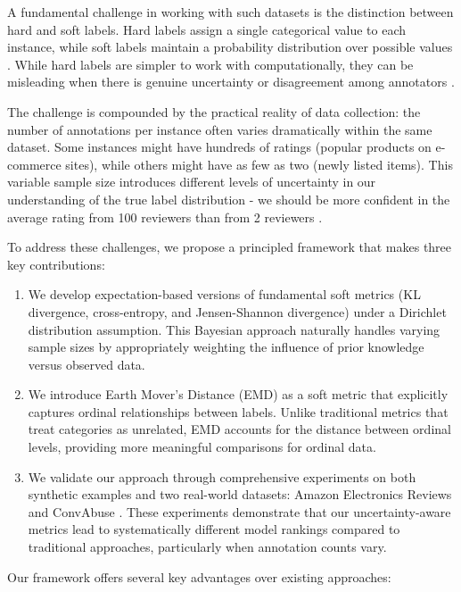 \documentclass[journal]{IEEEtran}
\begin{document}
A fundamental challenge in working with such datasets is the distinction between hard and soft labels. Hard labels assign a single categorical value to each instance, while soft labels maintain a probability distribution over possible values \cite{peterson2019}. While hard labels are simpler to work with computationally, they can be misleading when there is genuine uncertainty or disagreement among annotators \cite{uma2021}.

The challenge is compounded by the practical reality of data collection: the number of annotations per instance often varies dramatically within the same dataset. Some instances might have hundreds of ratings (popular products on e-commerce sites), while others might have as few as two (newly listed items). This variable sample size introduces different levels of uncertainty in our understanding of the true label distribution - we should be more confident in the average rating from 100 reviewers than from 2 reviewers \cite{uma2021}.

To address these challenges, we propose a principled framework that makes three key contributions:

\begin{enumerate}
    \item We develop expectation-based versions of fundamental soft metrics (KL divergence, cross-entropy, and Jensen-Shannon divergence) under a Dirichlet distribution assumption. This Bayesian approach naturally handles varying sample sizes by appropriately weighting the influence of prior knowledge versus observed data.
    
    \item We introduce Earth Mover's Distance (EMD) as a soft metric that explicitly captures ordinal relationships between labels. Unlike traditional metrics that treat categories as unrelated, EMD accounts for the distance between ordinal levels, providing more meaningful comparisons for ordinal data.
    
    \item We validate our approach through comprehensive experiments on both synthetic examples and two real-world datasets: Amazon Electronics Reviews \cite{he2016} and ConvAbuse \cite{cercas2021}. These experiments demonstrate that our uncertainty-aware metrics lead to systematically different model rankings compared to traditional approaches, particularly when annotation counts vary.
\end{enumerate}

Our framework offers several key advantages over existing approaches:
\end{document}
